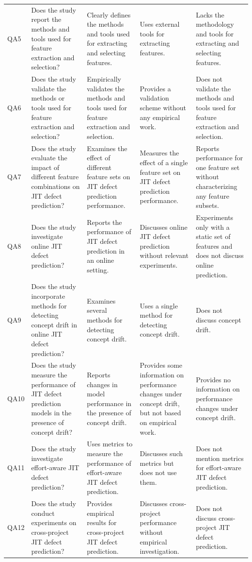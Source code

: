 \documentclass[sigconf,review]{acmart}
\begin{document}
\begin{table}[t]
\begin{tabular}{@{}p{}p{}p{}p{}p{}@{}}
        QA5 & Does the study report the methods and tools used for feature extraction and selection? & Clearly defines the methods and tools used for extracting and selecting features. & Uses external tools for extracting features. & Lacks the methodology and tools for extracting and selecting features. \\
        QA6 & Does the study validate the methods or tools used for feature extraction and selection? & Empirically validates the methods and tools used for feature extraction and selection. & Provides a validation scheme without any empirical work. & Does not validate the methods and tools used for feature extraction and selection. \\
        QA7 & Does the study evaluate the impact of different feature combinations on JIT defect prediction? & Examines the effect of different feature sets on JIT defect prediction performance. & Measures the effect of a single feature set on JIT defect prediction performance. & Reports performance for one feature set without characterizing any feature subsets. \\
        QA8 & Does the study investigate online JIT defect prediction? & Reports the performance of JIT defect prediction in an online setting. & Discusses online JIT defect prediction without relevant experiments. & Experiments only with a static set of features and does not discuss online prediction. \\
        QA9 & Does the study incorporate methods for detecting concept drift in online JIT defect prediction? & Examines several methods for detecting concept drift. & Uses a single method for detecting concept drift. & Does not discuss concept drift. \\
        QA10 & Does the study measure the performance of JIT defect prediction models in the presence of concept drift? & Reports changes in model performance in the presence of concept drift. & Provides some information on performance changes under concept drift, but not based on empirical work. & Provides no information on performance changes under concept drift. \\
        QA11 & Does the study investigate effort-aware JIT defect prediction? & Uses metrics to measure the performance of effort-aware JIT defect prediction. & Discusses such metrics but does not use them. & Does not mention metrics for effort-aware JIT defect prediction. \\
        QA12 & Does the study conduct experiments on cross-project JIT defect prediction? & Provides empirical results for cross-project JIT defect prediction. & Discusses cross-project performance without empirical investigation. & Does not discuss cross-project JIT defect prediction. \\
        \bottomrule
    \end{tabular}
\end{table}
\end{document}
